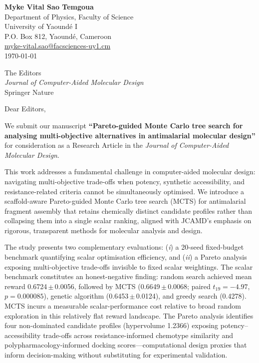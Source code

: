 \documentclass[9pt,letterpaper]{article}
\begin{document}
\fontsize{9}{10.5}\selectfont

\begin{flushleft}
\textbf{Myke Vital Sao Temgoua} \\
Department of Physics, Faculty of Science \\
University of Yaound\'{e} I \\
P.O. Box 812, Yaound\'{e}, Cameroon \\
\href{mailto:myke-vital.sao@facsciences-uy1.cm}{myke-vital.sao@facsciences-uy1.cm} \\[0.8em]
\today
\end{flushleft}

\begin{flushleft}
The Editors \\
\textit{Journal of Computer-Aided Molecular Design} \\
Springer Nature
\end{flushleft}

\vspace{0.2em}

\noindent Dear Editors,

We submit our manuscript \textbf{``Pareto-guided Monte Carlo tree search for analysing multi-objective alternatives in antimalarial molecular design''} for consideration as a Research Article in the \textit{Journal of Computer-Aided Molecular Design}.

This work addresses a fundamental challenge in computer-aided molecular design: navigating multi-objective trade-offs when potency, synthetic accessibility, and resistance-related criteria cannot be simultaneously optimised. We introduce a scaffold-aware Pareto-guided Monte Carlo tree search (MCTS) for antimalarial fragment assembly that retains chemically distinct candidate profiles rather than collapsing them into a single scalar ranking, aligned with JCAMD's emphasis on rigorous, transparent methods for molecular analysis and design.

The study presents two complementary evaluations: (\textit{i}) a \num{20}-seed fixed-budget benchmark quantifying scalar optimisation efficiency, and (\textit{ii}) a Pareto analysis exposing multi-objective trade-offs invisible to fixed scalar weightings. The scalar benchmark constitutes an honest-negative finding: random search achieved mean reward \num{0.6724}\,$\pm$\,\num{0.0056}, followed by MCTS (\num{0.6649}\,$\pm$\,\num{0.0068}; paired $t_{19} = -4.97$, $p = 0.000085$), genetic algorithm (\num{0.6453}\,$\pm$\,\num{0.0124}), and greedy search (\num{0.4278}). MCTS incurs a measurable scalar-performance cost relative to broad random exploration in this relatively flat reward landscape. The Pareto analysis identifies four non-dominated candidate profiles (hypervolume \num{1.2366}) exposing potency--accessibility trade-offs across resistance-informed chemotype similarity and polypharmacology-informed docking scores—computational design proxies that inform decision-making without substituting for experimental validation.
\end{document}
